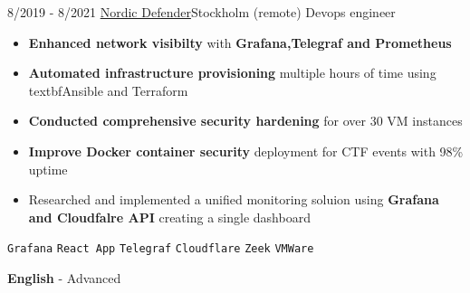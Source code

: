 \documentclass[9pt]{developercv} %
\begin{document}
\begin{center}
    \hdashrule[0.2ex]{\linewidth}{0.5pt}{.8mm}
\end{center}
\vspace{5pt}
\begin{entrylist}
    \entry
    {8/2019 - 8/2021}
    {\href{https://nordicdefender.com/}{Nordic Defender}\newline\small\textnormal{Stockholm (remote)}}
    {Devops engineer}
    {\vspace{-6pt}
        \begin{itemize}[itemsep=2pt,topsep=0pt,parsep=0pt,partopsep=0pt, leftmargin=-1pt]
            \item{\textbf{Enhanced network visibilty} with \textbf{Grafana,Telegraf and Prometheus}}
            \item{\textbf{Automated infrastructure provisioning} multiple hours of time using textbf{Ansible and Terraform}}
            \item{\textbf{Conducted comprehensive security hardening} for over 30 VM instances}
            \item{\textbf{Improve Docker container security} deployment for CTF events with 98\% uptime}
            \item{Researched and implemented a unified monitoring soluion using \textbf{Grafana and Cloudfalre API} creating a single dashboard}
        \end{itemize}
        \texttt{Grafana} \slashsep \texttt{React App} \slashsep \texttt{Telegraf} \slashsep \texttt{Cloudflare} \slashsep \texttt{Zeek} \slashsep \texttt{VMWare}}
\end{entrylist}
\vspace{-10 pt}
\vspace{-6pt}

\hspace{26mm} \textbf{English} - Advanced

\end{document}
